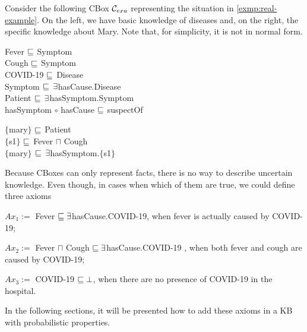 \begin{example}
	\label{exmp:el-cbox-def}
	Consider the following CBox $\mathcal{C}_{exa}$ representing the situation in \cref{exmp:real-example}. On the left, we have basic knowledge of diseases and, on the right, the specific knowledge about Mary. Note that, for simplicity, it is not in normal form.

		{
			\sffamily
			\begin{center}
				\begin{minipage}{0,4\textwidth}
					\fontsize{10}{14}
					\selectfont
					Fever $\sqsubseteq$ Symptom\\
					Cough $\sqsubseteq$ Symptom\\
					COVID-19 $\sqsubseteq$ Disease\\
					Symptom $\sqsubseteq \, \exists$hasCause.Disease\\
					Patient $\sqsubseteq\, \exists$hasSymptom.Symptom\\
					hasSymptom $\circ$ hasCause $\sqsubseteq$ suspectOf\\
				\end{minipage}
				\hspace{10pt}
				\begin{minipage}{0,4\textwidth}
					\fontsize{10}{14}
					\selectfont
					$\{$mary$\}$ $\sqsubseteq$ Patient\\
					$\{$s1$\}$ $\sqsubseteq$ Fever $\sqcap$ Cough\\
					$\{$mary$\}$ $\sqsubseteq \, \exists$hasSymptom.$\{$s1$\}$\\
				\end{minipage}
			\end{center}
		}

	Because CBoxes can only represent facts, there is no way to describe uncertain knowledge. Even though, in cases when which of them are true, we could define three axioms

	\begin{description}
		\item { \sffamily $Ax_1 := $ Fever $\sqsubseteq \exists$hasCause.COVID-19}, when fever is actually caused by COVID-19;
		\item { \sffamily $Ax_2 :=$ Fever $\sqcap$ Cough $\sqsubseteq \exists$hasCause.COVID-19 }, when both fever and cough are caused by COVID-19;
		\item { \sffamily $Ax_3 :=$ COVID-19 $\sqsubseteq \bot$}, when there are no presence of COVID-19 in the hospital.
	\end{description}

	In the following sections, it will be presented how to add these axioms in a KB with probabilistic properties.
\end{example}


